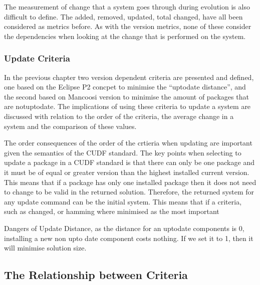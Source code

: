 The measurement of change that a system goes through during evolution is also difficult to define.
The added, removed, updated, total changed, have all been considered as metrics before. 
As with the version metrics, none of these consider the dependencies when looking at the change that is performed on the system.

\subsubsection{Update Criteria}
{}In the previous chapter two version dependent criteria are presented and defined, one based on the Eclipse P2 concpet to minimise the ``uptodate distance'', 
{}and the second based on Mancoosi version to minimise the amount of packages that are notuptodate. 
{}The implications of using these criteria to update a system are discussed with relation to the order of the criteria, the average change in a system and the comparison of these values.

The order consequences of the order of the crtieria when updating are important given the semantics of the CUDF standard.
The key points when selecting to update a package in a CUDF standard is that there can only be one package and it must be of equal or greater version than the highest installed current version.
This means that if a package has only one installed package then it does not need to change to be valid in the returned solution.
Therefore, the returned system for any update command can be the initial system.
This means that if a criteria, such as changed, or hamming where minimised as the most important  

Dangers of Update Distance, as the distance for an uptodate components is 0, installing a new non upto date component costs nothing. If we set it to 1, then it will minimise solution size.
\subsection{The Relationship between Criteria}



